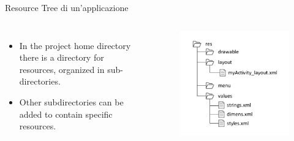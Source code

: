 \documentclass{beamer}
\begin{document}
  \begin{frame}{Resource Tree di un'applicazione}

    \begin{columns}[c]
        \begin{itemize}\itemsep20pt
          \item In the project home directory there is a  directory for
          resources, organized in sub-directories.
          \item Other subdirectories can be added to contain specific resources.
        \end{itemize}
        \begin{figure}
          \includegraphics[width=1\linewidth]{figures/res-tree.pdf}
        \end{figure}
    \end{columns}
  \end{frame}
\end{document}
